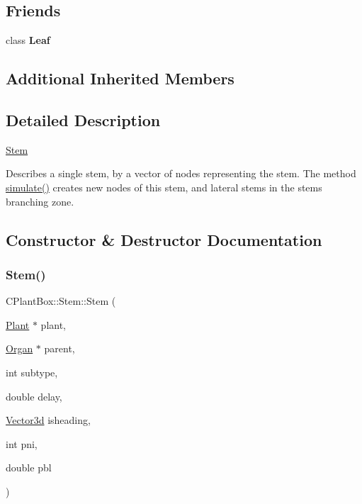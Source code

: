 \subsection*{Friends}
\begin{DoxyCompactItemize}
\item 
\mbox{\label{classCPlantBox_1_1Stem_a82dc71255bf67862ff5a8bcaceaff0aa}} 
class {\bfseries Leaf}
\end{DoxyCompactItemize}
\subsection*{Additional Inherited Members}


\subsection{Detailed Description}
\hyperlink{classCPlantBox_1_1Stem}{Stem}

Describes a single stem, by a vector of nodes representing the stem. The method \hyperlink{classCPlantBox_1_1Stem_ad2f7f8607fe02dbe2f4d4335248cf90b}{simulate()} creates new nodes of this stem, and lateral stems in the stem\textquotesingle{}s branching zone. 

\subsection{Constructor \& Destructor Documentation}
\mbox{\label{classCPlantBox_1_1Stem_a6ae67c6b507172aae16733c79a9322a3}} 
\subsubsection{\texorpdfstring{Stem()}{Stem()}}
{\footnotesize\ttfamily C\+Plant\+Box\+::\+Stem\+::\+Stem (\begin{DoxyParamCaption}\item[{\hyperlink{classCPlantBox_1_1Plant}{Plant} $\ast$}]{plant,  }\item[{\hyperlink{classCPlantBox_1_1Organ}{Organ} $\ast$}]{parent,  }\item[{int}]{subtype,  }\item[{double}]{delay,  }\item[{\hyperlink{classCPlantBox_1_1Vector3d}{Vector3d}}]{isheading,  }\item[{int}]{pni,  }\item[{double}]{pbl }\end{DoxyParamCaption})}



